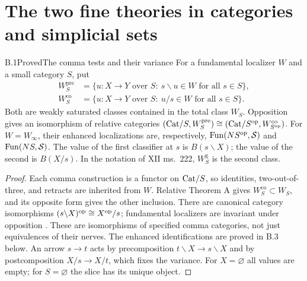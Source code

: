 \section{The two fine theories in categories and simplicial sets}

\begin{claim}{B.1}{Proved}{The comma tests and their variance}
For a fundamental localizer $W$ and a small category $S$, put
\[
\begin{aligned}
 W^{\mathrm{pre}}_S&=\{u:X\to Y\text{ over }S:\ s\backslash u\in W\text{ for all }s\in S\},\\
 W^{\mathrm{co}}_S&=\{u:X\to Y\text{ over }S:\ u/s\in W\text{ for all }s\in S\}.
\end{aligned}
\]
Both are weakly saturated classes contained in the total class $W_S$.
Opposition gives an isomorphism of relative categories
$(\mathrm{Cat}/S,W^{\mathrm{pre}}_S)\cong
(\mathrm{Cat}/S^{\mathrm{op}},W^{\mathrm{co}}_{S^{\mathrm{op}}})$.
For $W=W_\infty$, their enhanced localizations are, respectively,
$\mathrm{Fun}(NS^{\mathrm{op}},\mathcal S)$ and $\mathrm{Fun}(NS,\mathcal S)$.
The value of the first classifier at $s$ is $B(s\backslash X)$;
the value of the second is $B(X/s)$.
In the notation of XII ms.~222, $W^{\mathrm g}_S$ is the second class.
\end{claim}
\begin{proof}
Each comma construction is a functor on $\mathrm{Cat}/S$, so identities, two-out-of-three,
and retracts are inherited from $W$. Relative Theorem A gives
$W^{\mathrm{co}}_S\subset W_S$, and its opposite form gives the other inclusion.
There are canonical category isomorphisms
$(s\backslash X)^{\mathrm{op}}\cong X^{\mathrm{op}}/s$; fundamental localizers are invariant
under opposition \citep[Sorites 3.3.8]{BCCisinski2006}. These are isomorphisms
of specified comma categories, not just equivalences of their nerves.
The enhanced identifications are proved in B.3 below. An arrow $s\to t$
acts by precomposition $t\backslash X\to s\backslash X$ and by
postcomposition $X/s\to X/t$, which fixes the variance. For $X=\varnothing$
all values are empty; for $S=\varnothing$ the slice has its unique object.
\end{proof}

